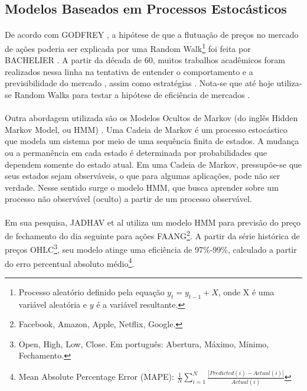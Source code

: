 \subsection{Modelos Baseados em Processos Estocásticos}

\paragraph{} De acordo com GODFREY \cite{godfrey1964random}, a hipótese de que a flutuação de preços no mercado de ações poderia ser explicada por uma Random Walk\footnote{Processo aleatório definido pela equação \begin{math}y_t = y_{t-1} + X\end{math}, onde X é uma variável aleatória e \(y\) é a variável resultante.} foi feita por BACHELIER \cite{bachelier1900theorie}. A partir da década de 60, muitos trabalhos acadêmicos foram realizados nessa linha na tentativa de entender o comportamento e a previsibilidade do mercado \cite{fama1970efficient, solnik1973note, cooper1982world}, assim como estratégias \cite{malkiel2019random}. Nota-se que até hoje utiliza-se Random Walks para testar a hipótese de eficiência de mercados \cite{said2015efficiency}.

\paragraph{} Outra abordagem utilizada são os Modelos Ocultos de Markov (do inglês Hidden Markov Model, ou HMM) \cite{rabiner1989tutorial}. Uma Cadeia de Markov é um processo estocástico que modela um sistema por meio de uma sequência finita de estados. A mudança ou a permanência em cada estado é determinada por probabilidades que dependem somente do estado atual. Em uma Cadeia de Markov, pressupõe-se que seus estados sejam observáveis, o que para algumas aplicações, pode não ser verdade. Nesse sentido surge o modelo HMM, que busca aprender sobre um processo não observável (oculto) a partir de um processo observável.

\paragraph{} Em sua pesquisa, JADHAV et al \cite{jadhav2021forecasting} utiliza um modelo HMM para previsão do preço de fechamento do dia seguinte para ações FAANG\footnote{Facebook, Amazon, Apple, Netflix, Google.}. A partir da série histórica de preços OHLC\footnote{Open, High, Low, Close. Em português: Abertura, Máximo, Mínimo, Fechamento.}, seu modelo atinge uma eficiência de 97\%-99\%, calculado a partir do erro percentual absoluto médio\footnote{Mean Absolute Percentage Error (MAPE): \begin{math} \frac{1}{N}\sum_{i=1}^{N} \frac{|Predicted(i)-Actual(i)|}{Actual(i)} \end{math}}.

